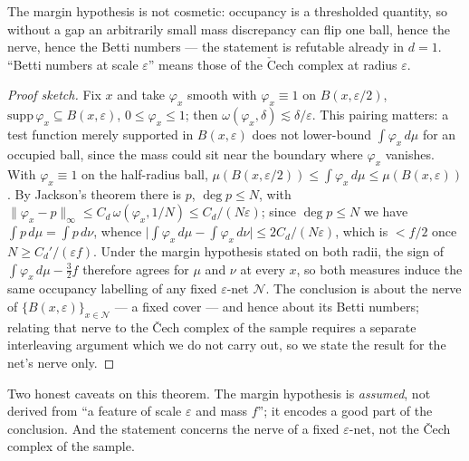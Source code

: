 \documentclass[11pt]{article}
\theoremstyle{remark}
\begin{document}
The margin hypothesis is not cosmetic: occupancy is a thresholded quantity, so without a gap an
arbitrarily small mass discrepancy can flip one ball, hence the nerve, hence the Betti numbers ---
the statement is refutable already in $d=1$. ``Betti numbers at scale $\varepsilon$'' means those
of the $\check{\mathrm C}$ech complex at radius $\varepsilon$.

\begin{proof}[Proof sketch]
Fix $x$ and take $\varphi_x$ smooth with $\varphi_x\equiv1$ on $B(x,\varepsilon/2)$,
$\mathrm{supp}\,\varphi_x\subseteq B(x,\varepsilon)$, $0\le\varphi_x\le1$; then
$\omega(\varphi_x,\delta)\lesssim\delta/\varepsilon$. This pairing matters: a test function merely
supported in $B(x,\varepsilon)$ does not lower-bound $\int\varphi_x\,d\mu$ for an occupied ball,
since the mass could sit near the boundary where $\varphi_x$ vanishes. With $\varphi_x\equiv1$ on
the half-radius ball, $\mu(B(x,\varepsilon/2))\le\int\varphi_x\,d\mu\le\mu(B(x,\varepsilon))$.
By Jackson's theorem there is $p$, $\deg p\le N$, with
$\lVert\varphi_x-p\rVert_\infty\le C_d\,\omega(\varphi_x,1/N)\le C_d/(N\varepsilon)$; since
$\deg p\le N$ we have $\int p\,d\mu=\int p\,d\nu$, whence
$\lvert\int\varphi_x\,d\mu-\int\varphi_x\,d\nu\rvert\le2C_d/(N\varepsilon)$, which is $<f/2$ once
$N\ge C_d'/(\varepsilon f)$. Under the margin hypothesis stated on both radii, the sign of
$\int\varphi_x\,d\mu-\tfrac{3}{2}f$ therefore agrees for $\mu$ and $\nu$ at every $x$, so both
measures induce the same occupancy labelling of any fixed $\varepsilon$-net $\mathcal N$. The
conclusion is about the nerve of $\{B(x,\varepsilon)\}_{x\in\mathcal N}$ --- a fixed cover ---
and hence about its Betti numbers; relating that nerve to the \v{C}ech complex of the sample
requires a separate interleaving argument which we do not carry out, so we state the result for
the net's nerve only.
\end{proof}

Two honest caveats on this theorem. The margin hypothesis is \emph{assumed}, not derived from
``a feature of scale $\varepsilon$ and mass $f$''; it encodes a good part of the conclusion. And
the statement concerns the nerve of a fixed $\varepsilon$-net, not the \v{C}ech complex of the
sample.
\end{document}
